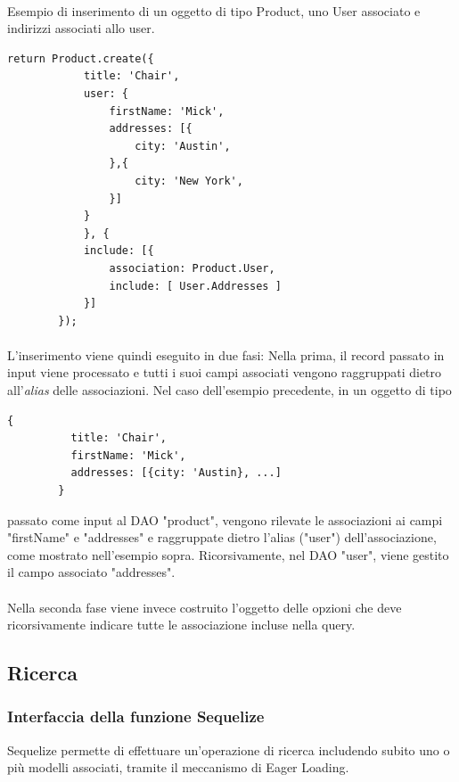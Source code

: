 \documentclass[a4paper, 12pt]{report}
\begin{document}
      \paragraph*{}
      Esempio di inserimento di un oggetto di tipo Product, uno User associato e indirizzi associati allo user.
      \begin{Verbatim}[samepage=true]
        return Product.create({
            title: 'Chair',
            user: {
                firstName: 'Mick',
                addresses: [{
                    city: 'Austin',
                },{
                    city: 'New York',
                }]
            }
            }, {
            include: [{
                association: Product.User,
                include: [ User.Addresses ]
            }]
        });
      \end{Verbatim}
      \paragraph*{}
      L'inserimento viene quindi eseguito in due fasi:
      Nella prima, il record passato in input viene processato e tutti i suoi campi associati vengono raggruppati dietro all'\emph{alias} delle associazioni.
      Nel caso dell'esempio precedente, in un oggetto di tipo
      \begin{Verbatim}[samepage=true]
        {
          title: 'Chair', 
          firstName: 'Mick',
          addresses: [{city: 'Austin}, ...]
        }
      \end{Verbatim}
      passato come input al DAO "product", vengono rilevate le associazioni ai campi "firstName" e "addresses" e raggruppate dietro l'alias ("user") dell'associazione, come mostrato nell'esempio sopra.
      Ricorsivamente, nel DAO "user", viene gestito il campo associato "addresses".
      \paragraph*{}
      Nella seconda fase viene invece costruito l'oggetto delle opzioni che deve ricorsivamente indicare tutte le associazione incluse nella query.
    \newpage
    \subsection{Ricerca}
      \subsubsection*{Interfaccia della funzione Sequelize}
        Sequelize permette di effettuare un'operazione di ricerca includendo subito uno o più modelli associati, tramite il meccanismo di Eager Loading.
\end{document}
